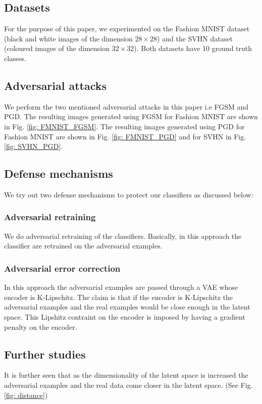\documentclass[journal]{IEEEtran}
\begin{document}
\subsection{Datasets}
For the purpose of this paper, we experimented on the Fashion MNIST dataset (black and white images of the dimension $28 \times 28$) and the SVHN dataset (coloured images of the dimension $32 \times 32$). Both datasets have 10 ground truth classes.

\subsection{Adversarial attacks}
We perform the two mentioned adversarial attacks in this paper i.e FGSM\cite{FGSM} and PGD\cite{PGD}. The resulting images generated using FGSM for Fashion MNIST are shown in Fig. \ref{fig: FMNIST_FGSM}. The resulting images generated using PGD for Fashion MNIST are shown in Fig. \ref{fig: FMNIST_PGD} and for SVHN in Fig. \ref{fig: SVHN_PGD}.

\subsection{Defense mechanisms}
We try out two defense mechanisms to protect our classifiers as discussed below:

\subsubsection{Adversarial retraining}
We do adversarial retraining of the classifiers. Basically, in this approach the classifier are retrained on the adversarial examples.

\subsubsection{Adversarial error correction}
In this approach the adversarial examples are passed through a VAE whose encoder is K-Lipschitz. The claim is that if the encoder is K-Lipschitz the adversarial examples and the real examples would be close enough in the latent space. This Lipshitz contraint on the encoder is imposed by having a gradient penalty on the encoder.

\subsection{Further studies}
It is further seen that as the dimensionality of the latent space is increased the adversarial examples and the real data come closer in the latent space. (See Fig. \ref{fig: distance})
\end{document}
